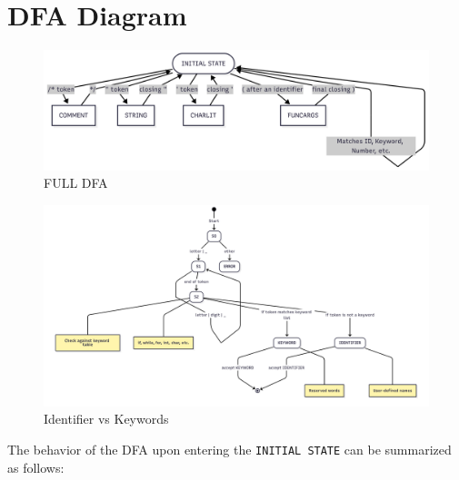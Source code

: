 \documentclass[12pt,a4paper]{article}
\begin{document}
\vspace{2cm}

\section{DFA Diagram}

\begin{figure}[H]
    \centering %
    \includegraphics[width=1\textwidth]{Initial States.png}
    \caption{FULL DFA}
\end{figure}

\begin{figure}[H]
    \centering %
    \includegraphics[width=1\textwidth]{IDKEY.png}
    \caption{Identifier vs Keywords}
\end{figure}

The behavior of the DFA upon entering the \texttt{INITIAL STATE} can be summarized as follows:
\end{document}

